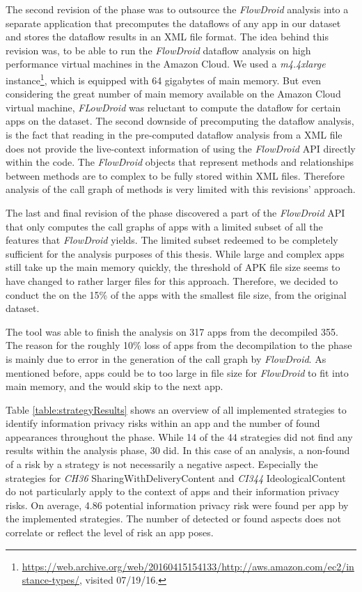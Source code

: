 The second revision of the \sca phase was to outsource the \textit{FlowDroid} analysis into a separate application that precomputes the dataflows of any app in our dataset and stores the dataflow results in an \acs{XML} file format.
The idea behind this revision was, to be able to run the \textit{FlowDroid} dataflow analysis on high performance virtual machines in the Amazon Cloud.
We used a \textit{m4.4xlarge} instance\footnote{\url{https://web.archive.org/web/20160415154133/http://aws.amazon.com/ec2/instance-types/}, visited 07/19/16.}, which is equipped with 64 gigabytes of main memory.
But even considering the great number of main memory available on the Amazon Cloud virtual machine, \textit{FLowDroid} was reluctant to compute the dataflow for certain apps on the dataset.
The second downside of precomputing the dataflow analysis, is the fact that reading in the pre-computed dataflow analysis from a XML file does not provide the live-context information of using the \textit{FlowDroid} API directly within the code.
The \textit{FlowDroid} objects that represent methods and relationships between methods are to complex to be fully stored within XML files.
Therefore analysis of the call graph of methods is very limited with this revisions' approach.

The last and final revision of the \sca phase discovered a part of the \textit{FlowDroid} API that only computes the call graphs of apps with a limited subset of all the features that \textit{FlowDroid} yields.
The limited subset redeemed to be completely sufficient for the analysis purposes of this thesis.
While large and complex apps still take up the main memory quickly, the threshold of APK file size seems to have changed to rather larger files for this approach.
Therefore, we decided to conduct the \sca on the 15\% of the apps with the smallest file size, from the original dataset.

The \sca tool was able to finish the analysis on 317 apps from the decompiled 355.
The reason for the roughly 10\% loss of apps from the decompilation to the \sca phase is mainly due to error in the generation of the call graph by \textit{FlowDroid}.
As mentioned before, apps could be to too large in file size for \textit{FlowDroid} to fit into main memory, and the \sca would skip to the next app.

Table \ref{table:strategyResults} shows an overview of all implemented strategies to identify information privacy risks within an app and the number of found appearances throughout the \sca phase.
While 14 of the 44 strategies did not find any \ipr results within the analysis phase, 30 did.
In this case of an \ipr analysis, a non-found of a risk by a strategy is not necessarily a negative aspect.
Especially the strategies for \textit{CH36} SharingWithDeliveryContent and \textit{CI344} IdeologicalContent do not particularly apply to the context of \mH apps and their information privacy risks.
On average, 4.86 potential information privacy risk were found per app by the implemented strategies.
The number of detected or found \ipr aspects does not correlate or reflect the level of risk an app poses.

